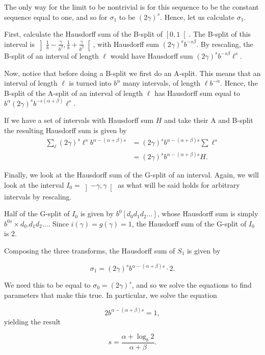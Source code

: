 \documentclass[11pt, reqno]{amsart}
\begin{document}
The only way for the limit to be nontrivial is for this sequence to be the constant sequence equal to one, and so for $\sigma_1$ to be $(2 \gamma)^s$. Hence, let us calculate $\sigma_1$.

First, calculate the Hausdorff sum of the B-split of $\left[0, 1 \right[$. The B-split of this interval is $\left] \frac 1 b - \frac \gamma{b^\beta}, \frac 1 b + \frac \gamma{b^\beta} \right[$, with Hausdorff sum $(2 \gamma)^s b^{-s \beta}$. By rescaling, the B-split of an interval of length $\ell$ would have Hausdorff sum $(2 \gamma)^s b^{-s \beta} \ell^s$.

Now, notice that before doing a B-split we first do an A-split. This means that an interval of length $\ell$ is turned into $b^\alpha$ many intervals, of length $\ell b^{-\alpha}$. Hence, the B-split of the A-split of an interval of length $\ell$ has Hausdorff sum equal to $b^\alpha (2 \gamma)^s b^{-s (\alpha + \beta)} \ell^s$.

If we have a set of intervals with Hausdorff sum $H$ and take their A and B-split the resulting Hausdorff sum is given by
\begin{align*}
\sum_\ell (2 \gamma)^s \ell^s b^{\alpha - (\alpha + \beta) s} &=
(2 \gamma)^s b^{\alpha - (\alpha + \beta) s} \sum \ell^s\\
&= (2 \gamma)^s b^{\alpha - (\alpha + \beta) s} H.
\end{align*}

Finally, we look at the Hausdorff sum of the G-split of an interval. Again, we will look at the interval $I_0 = \left] -\gamma, \gamma \right[$ as what will be said holds for arbitrary intervals by rescaling.

Half of the G-split of $I_0$ is given by $b^0 [ d_0 d_1 d_2 \dots]$, whose Hausdorff sum is simply $b^{0s} \times d_0 . d_1 d_2 \dots$. Since $i(\gamma) = g(\gamma) = 1$, the Hausdorff sum of the G-split of $I_0$ is 2.

Composing the three transforms, the Hausdorff sum of $S_1$ is given by

\[\sigma_1 = (2 \gamma)^s b^{\alpha - (\alpha + \beta) s} \cdot 2.\]

We need this to be equal to $\sigma_0 = (2 \gamma)^s$, and so we solve the equations to find parameters that make this true. In particular, we solve the equation

\[ 2 b^{\alpha - (\alpha + \beta) s} = 1,\]
yielding the result

\[s = \frac{\alpha + \log_b 2}{\alpha + \beta}.\]
\end{document}

